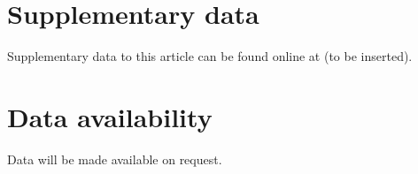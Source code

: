 \documentclass[preprint,12pt,times]{elsarticle}
\begin{document}
\appendix
\section{Supplementary data}
Supplementary data to this article can be found online at (to be inserted).

\section*{Data availability}
Data will be made available on request.
{\small


}
\end{document}
